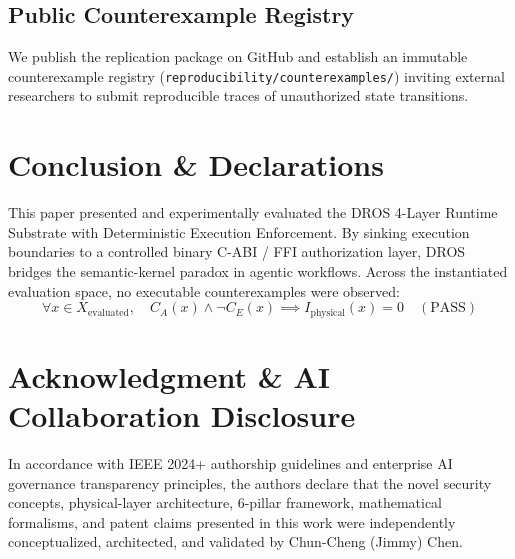 \documentclass[conference]{IEEEtran}
\begin{document}
\subsection{Public Counterexample Registry}
We publish the replication package on GitHub and establish an immutable counterexample registry (\texttt{reproducibility/counterexamples/}) inviting external researchers to submit reproducible traces of unauthorized state transitions.

\section{Conclusion \& Declarations}
This paper presented and experimentally evaluated the DROS 4-Layer Runtime Substrate with Deterministic Execution Enforcement. By sinking execution boundaries to a controlled binary C-ABI / FFI authorization layer, DROS bridges the semantic-kernel paradox in agentic workflows. Across the instantiated evaluation space, no executable counterexamples were observed:
\begin{equation}
\forall x \in X_{\text{evaluated}}, \quad C_A(x) \land \neg C_E(x) \implies I_{\text{physical}}(x) = 0 \quad (\text{PASS})
\end{equation}

\section*{Acknowledgment \& AI Collaboration Disclosure}
In accordance with IEEE 2024+ authorship guidelines and enterprise AI governance transparency principles, the authors declare that the novel security concepts, physical-layer architecture, 6-pillar framework, mathematical formalisms, and patent claims presented in this work were independently conceptualized, architected, and validated by Chun-Cheng (Jimmy) Chen.
\end{document}
